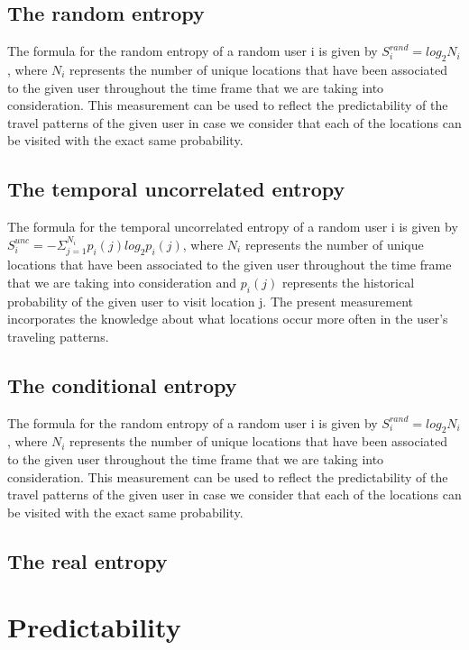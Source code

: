 \subsection{The random entropy}

The formula for the random entropy of a random user i is given by $S_{i}^{rand}
= log_{2}N_{i}$, where $N_{i}$ represents the number of unique locations that
have been associated to the given user throughout the time frame that we are
taking into consideration. This measurement can be used to reflect the
predictability of the travel patterns of the given user in case we consider that
each of the locations can be visited with the exact same probability.

\subsection{The temporal uncorrelated entropy}

The formula for the temporal uncorrelated entropy of a random user i is given by
$S_{i}^{unc} = -\Sigma_{j=1}^{N_{i}}p_{i}(j)log_{2}p_{i}(j)$, where $N_{i}$
represents the number of unique locations that have been associated to the given
user throughout the time frame that we are taking into consideration and
$p_{i}(j)$ represents the historical probability of the given user to visit
location j. The present measurement incorporates the knowledge about what
locations occur more often in the user's traveling patterns.

\subsection{The conditional entropy}
The formula for the random entropy of a random user i is given by $S_{i}^{rand}
= log_{2}N_{i}$, where $N_{i}$ represents the number of unique locations that
have been associated to the given user throughout the time frame that we are
taking into consideration. This measurement can be used to reflect the
predictability of the travel patterns of the given user in case we consider that
each of the locations can be visited with the exact same probability.

\subsection{The real entropy}

\section{Predictability}
